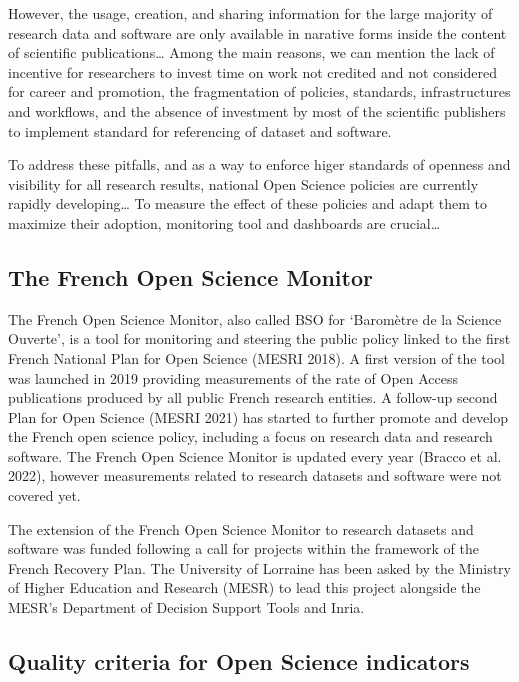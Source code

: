 \documentclass[
]{article}
\begin{document}
However, the usage, creation, and sharing information for the large
majority of research data and software are only available in narative
forms inside the content of scientific publications\ldots{} Among the
main reasons, we can mention the lack of incentive for researchers to
invest time on work not credited and not considered for career and
promotion, the fragmentation of policies, standards, infrastructures and
workflows, and the absence of investment by most of the scientific
publishers to implement standard for referencing of dataset and
software.

To address these pitfalls, and as a way to enforce higer standards of
openness and visibility for all research results, national Open Science
policies are currently rapidly developing\ldots{} To measure the effect
of these policies and adapt them to maximize their adoption, monitoring
tool and dashboards are crucial\ldots{}

\hypertarget{the-french-open-science-monitor}{%
\subsection{The French Open Science
Monitor}\label{the-french-open-science-monitor}}

The French Open Science Monitor, also called BSO for `Baromètre de la
Science Ouverte', is a tool for monitoring and steering the public
policy linked to the first French National Plan for Open Science (MESRI
2018). A first version of the tool was launched in 2019 providing
measurements of the rate of Open Access publications produced by all
public French research entities. A follow-up second Plan for Open
Science (MESRI 2021) has started to further promote and develop the
French open science policy, including a focus on research data and
research software. The French Open Science Monitor is updated every year
(Bracco et al. 2022), however measurements related to research datasets
and software were not covered yet.

The extension of the French Open Science Monitor to research datasets
and software was funded following a call for projects within the
framework of the French Recovery Plan. The University of Lorraine has
been asked by the Ministry of Higher Education and Research (MESR) to
lead this project alongside the MESR's Department of Decision Support
Tools and Inria.

\hypertarget{quality-criteria-for-open-science-indicators}{%
\subsection{Quality criteria for Open Science
indicators}\label{quality-criteria-for-open-science-indicators}}
\end{document}
